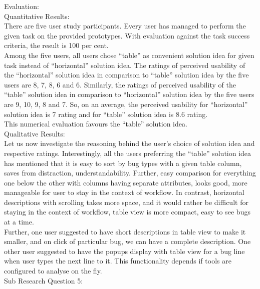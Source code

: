 Evaluation: \\

Quantitative Results: \\

There are five user study participants. Every user has managed to perform the given task on the provided prototypes. With evaluation against the task success criteria, the result is 100 per cent. \\

Among the five users, all users chose “table” as convenient solution idea for given task instead of “horizontal” solution idea. The ratings of perceived usability of the “horizontal” solution idea in comparison to “table” solution idea by the five users are 8, 7, 8, 6 and 6. Similarly, the ratings of perceived usability of the “table” solution idea in comparison to “horizontal” solution idea by the five users are 9, 10, 9, 8 and 7. So, on an average, the perceived usability for “horizontal” solution idea is 7 rating and for “table” solution idea is 8.6 rating. \\

This numerical evaluation favours the “table” solution idea. \\

Qualitative Results: \\

Let us now investigate the reasoning behind the user’s choice of solution idea and respective ratings. Interestingly, all the users preferring the “table” solution idea has mentioned that it is easy to sort by bug types with a given table column, saves from distraction, understandability. Further, easy comparison for everything one below the other with columns having separate attributes, looks good, more manageable for user to stay in the context of workflow. In contrast, horizontal descriptions with scrolling takes more space, and it would rather be difficult for staying in the context of workflow, table view is more compact, easy to see bugs at a time. \\

Further, one user suggested to have short descriptions in table view to make it smaller, and on click of particular bug, we can have a complete description. One other user suggested to have the popups display with table view for a bug line when user types the next line to it. This functionality depends if tools are configured to analyse on the fly. \\


Sub Research Question 5: \\

